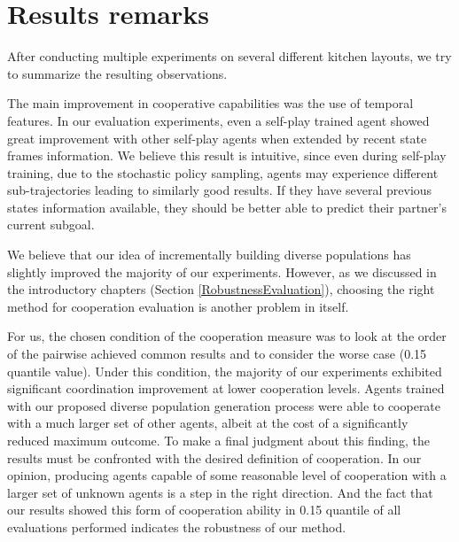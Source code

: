 \section{Results remarks}

After conducting multiple experiments on several different kitchen layouts, we try to summarize the resulting observations.

The main improvement in cooperative capabilities was the use of temporal features.
In our evaluation experiments, even a self-play trained agent showed great improvement with other self-play agents when extended by recent state frames information.
We believe this result is intuitive, since even during self-play training, due to the stochastic policy sampling, agents may experience different sub-trajectories leading to similarly good results.
If they have several previous states information available, they should be better able to predict their partner's current subgoal.

We believe that our idea of incrementally building diverse populations has slightly improved the majority of our experiments.
However, as we discussed in the introductory chapters (Section \ref{RobustnessEvaluation}), choosing the right method for cooperation evaluation is another problem in itself.

For us, the chosen condition of the cooperation measure was to look at the order of the pairwise achieved common results and to consider the worse case (0.15 quantile value).
Under this condition, the majority of our experiments exhibited significant coordination improvement at lower cooperation levels.
Agents trained with our proposed diverse population generation process were able to cooperate with a much larger set of other agents, albeit at the cost of a significantly reduced maximum outcome.
To make a final judgment about this finding, the results must be confronted with the desired definition of cooperation.
In our opinion, producing agents capable of some reasonable level of cooperation with a larger set of unknown agents is a step in the right direction.
And the fact that our results showed this form of cooperation ability in 0.15 quantile of all evaluations performed indicates the robustness of our method.


